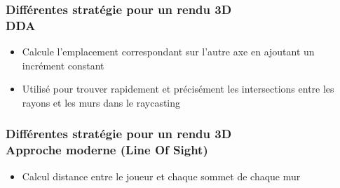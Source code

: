 \documentclass{beamer}
\begin{document}
\begin{frame}
    \frametitle{Différentes stratégie pour un rendu 3D \\
                \small DDA}           
    \begin{block}{}
        \begin{itemize}
            \item Calcule l'emplacement correspondant sur l'autre axe en ajoutant un incrément constant
            \item Utilisé pour trouver rapidement et précisément les intersections entre les rayons 
            et les murs dans le raycasting
        \end{itemize}
    \end{block}    
\end{frame}

\begin{frame}
    \frametitle{Différentes stratégie pour un rendu 3D \\
                \small Approche moderne (Line Of Sight)}           
    \begin{block}{}
        \begin{itemize}
            \item Calcul distance entre le joueur et chaque sommet de chaque mur
        \end{itemize}

    \end{block}    
\end{frame}
\end{document}

